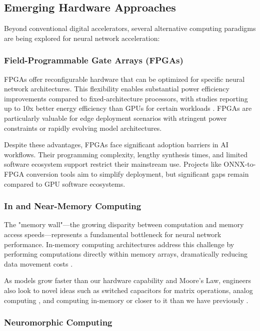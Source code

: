 \documentclass[manuscript,screen,review,format=acmsmall]{acmart}
\begin{document}
\subsection{Emerging Hardware Approaches}

Beyond conventional digital accelerators, several alternative computing paradigms are being explored for neural network acceleration:

\subsubsection{Field-Programmable Gate Arrays (FPGAs)}

FPGAs offer reconfigurable hardware that can be optimized for specific neural network architectures. This flexibility enables substantial power efficiency improvements compared to fixed-architecture processors, with studies reporting up to 10x better energy efficiency than GPUs for certain workloads \cite{MohaidatTamador2024ASoN}. FPGAs are particularly valuable for edge deployment scenarios with stringent power constraints or rapidly evolving model architectures. 

Despite these advantages, FPGAs face significant adoption barriers in AI workflows. Their programming complexity, lengthy synthesis times, and limited software ecosystem support restrict their mainstream use. Projects like ONNX-to-FPGA conversion tools \cite{ONNXFlow} aim to simplify deployment, but significant gaps remain compared to GPU software ecosystems.

\subsubsection{In and Near-Memory Computing}

The "memory wall"—the growing disparity between computation and memory access speeds—represents a fundamental bottleneck for neural network performance. In-memory computing architectures address this challenge by performing computations directly within memory arrays, dramatically reducing data movement costs \cite{LuWenbin2022BtB-}.

As models grow faster than our hardware capability and Moore's Law, engineers also look to novel ideas such as switched capacitors for matrix operations, analog computing \cite{MoolchandaniDiksha2021ACIo}, and computing in-memory or closer to it than we have previously \cite{10.1145/3571155} \cite{NiemierM.2024SDAt}.

\subsubsection{Neuromorphic Computing}
\end{document}
